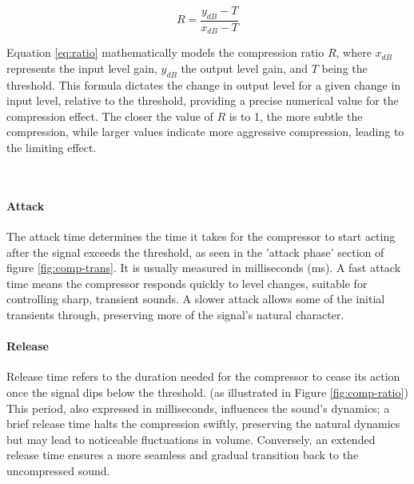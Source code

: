 \documentclass[10pt]{article}
\begin{document}
\begin{multicols*}{2}
                \begin{equation} \label{eq:ratio}
                    R=\frac{y_{dB}-T}{x_{dB}-T}
                \end{equation}

                \noindent Equation \ref{eq:ratio} mathematically models the compression ratio $R$, where $x_{dB}$ represents the input level gain, $y_{dB}$ the output level gain, and $T$ being the threshold. This formula dictates the change in output level for a given change in input level, relative to the threshold, providing a precise numerical value for the compression effect. The closer the value of $R$ is to 1, the more subtle the compression, while larger values indicate more aggressive compression, leading to the limiting effect.

                \noindent
                \begin{minipage}{\linewidth}
                    \centering
                    
                    \label{fig:comp-trans}
                \end{minipage}\\

            \paragraph{Attack}
                The attack time determines the time it takes for the compressor to start acting after the signal exceeds the threshold, as seen in the 'attack phase' section of figure \ref{fig:comp-trans}. It is usually measured in milliseconds (ms). A fast attack time means the compressor responds quickly to level changes, suitable for controlling sharp, transient sounds. A slower attack allows some of the initial transients through, preserving more of the signal's natural character.

            \paragraph{Release}
                Release time refers to the duration needed for the compressor to cease its action once the signal dips below the threshold. (as illustrated in Figure \ref{fig:comp-ratio}) This period, also expressed in milliseconds, influences the sound's dynamics; a brief release time halts the compression swiftly, preserving the natural dynamics but may lead to noticeable fluctuations in volume. Conversely, an extended release time ensures a more seamless and gradual transition back to the uncompressed sound.


\end{multicols*}
\end{document}
